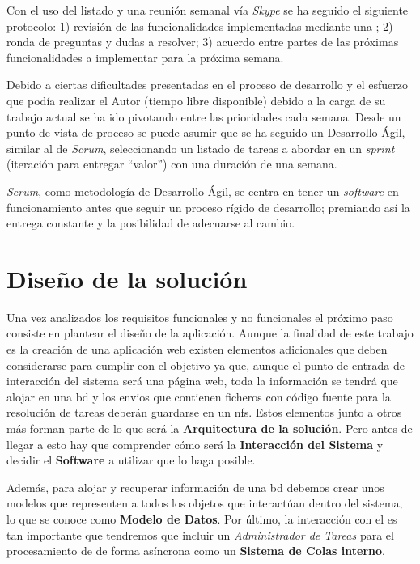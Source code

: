 \documentclass[11pt,spanish,listoffigures,listoftables]{tfgetsinf}
\begin{document}
Con el uso del listado y una reunión semanal vía \textit{Skype} se ha seguido el siguiente protocolo: 1) revisión de las funcionalidades implementadas mediante una ; 2) ronda de preguntas y dudas a resolver; 3) acuerdo entre partes de las próximas funcionalidades a implementar para la próxima semana.

Debido a ciertas dificultades presentadas en el proceso de desarrollo y el esfuerzo que podía realizar el Autor (tiempo libre disponible) debido a la carga de su trabajo actual se ha ido pivotando entre las prioridades cada semana. Desde un punto de vista de proceso se puede asumir que se ha seguido un Desarrollo Ágil, similar al de \textit{Scrum}, seleccionando un listado de tareas a abordar en un \textit{sprint} (iteración para entregar ``valor'') con una duración de una semana. 

\textit{Scrum}, como metodología de Desarrollo Ágil, se centra en tener un \textit{software} en funcionamiento antes que seguir un proceso rígido de desarrollo; premiando así la entrega constante y la posibilidad de adecuarse al cambio. 


\chapter{Diseño de la solución}

Una vez analizados los requisitos funcionales y no funcionales el próximo paso consiste en plantear el diseño de la aplicación. Aunque la finalidad de este trabajo es la creación de una aplicación web existen elementos adicionales que deben considerarse para cumplir con el objetivo ya que, aunque el punto de entrada de interacción del sistema será una página web, toda la información se tendrá que alojar en una \acrfull{bd} y los \gls{envio}s que contienen ficheros con código fuente para la resolución de \Gls{tarea}s deberán guardarse en un \acrfull{nfs}. Estos elementos junto a otros más forman parte de lo que será la \textbf{Arquitectura de la solución}. Pero antes de llegar a esto hay que comprender cómo será la \textbf{Interacción del Sistema} y decidir el \textbf{Software} a utilizar que lo haga posible. %

Además, para alojar y recuperar información de una \acrshort{bd} debemos crear unos modelos que representen a todos los objetos que interactúan dentro del sistema, lo que se conoce como \textbf{Modelo de Datos}. Por último, la interacción con el  \kahan es tan importante que tendremos que incluir un \textit{Administrador de Tareas} para el procesamiento de  de forma asíncrona como un \textbf{Sistema de Colas interno}.
\end{document}
